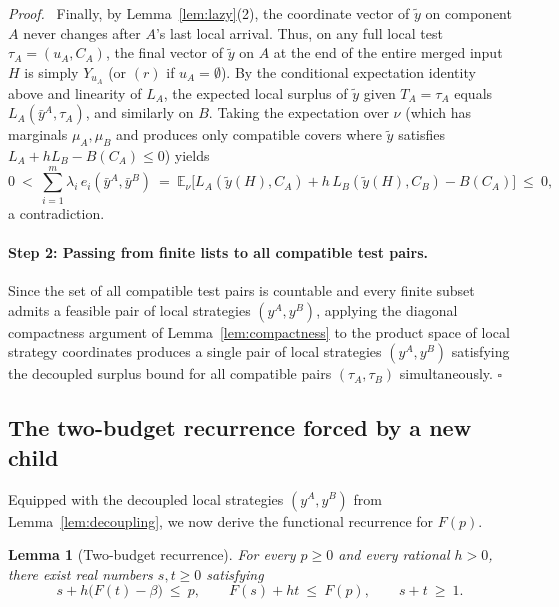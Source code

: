 \documentclass[11pt,letterpaper]{article}
\newtheorem{lemma}{Lemma}[section]
\newenvironment{proof}[1][Proof]{\par\smallskip\noindent\textit{#1.}\ \ignorespaces}{\hfill$\square$\par\medskip}
\begin{document}
\begin{proof}
Finally, by Lemma~\ref{lem:lazy}(2), the coordinate vector of $\tilde y$ on component $A$ never changes after $A$'s last local arrival. Thus, on any full local test $\tau_A=(u_A,C_A)$, the final vector of $\tilde y$ on $A$ at the end of the entire merged input $H$ is simply $Y_{u_A}$ (or $(r)$ if $u_A=\emptyset$). By the conditional expectation identity above and linearity of $L_A$, the expected local surplus of $\tilde y$ given $T_A=\tau_A$ equals $L_A(\bar y^A,\tau_A)$, and similarly on $B$. Taking the expectation over $\nu$ (which has marginals $\mu_A,\mu_B$ and produces only compatible covers where $\tilde y$ satisfies $L_A+hL_B-B(C_A)\le 0$) yields
\[
  0\ <\ \sum_{i=1}^m \lambda_i\, e_i(\bar y^A,\bar y^B)
  \ =\ \mathbb E_\nu\bigl[L_A(\tilde y(H),C_A) + h\,L_B(\tilde y(H),C_B) - B(C_A)\bigr]\ \le\ 0,
\]
a contradiction.

\paragraph{Step 2: Passing from finite lists to all compatible test pairs.}
Since the set of all compatible test pairs is countable and every finite subset admits a feasible pair of local strategies $(y^A,y^B)$, applying the diagonal compactness argument of Lemma~\ref{lem:compactness} to the product space of local strategy coordinates produces a single pair of local strategies $(y^A,y^B)$ satisfying the decoupled surplus bound for all compatible pairs $(\tau_A,\tau_B)$ simultaneously.
\end{proof}

\subsection{The two-budget recurrence forced by a new child}

Equipped with the decoupled local strategies $(y^A,y^B)$ from Lemma~\ref{lem:decoupling}, we now derive the functional recurrence for $F(p)$.

\begin{lemma}[Two-budget recurrence]\label{lem:recurrence}
For every $p\ge 0$ and every rational $h>0$, there exist real numbers $s,t\ge 0$ satisfying
\begin{equation}\label{eq:budgets}
  s + h\bigl(F(t)-\beta\bigr)\ \le\ p,\qquad
  F(s) + h t\ \le\ F(p),\qquad
  s + t\ \ge\ 1.
\end{equation}
\end{lemma}
\end{document}
